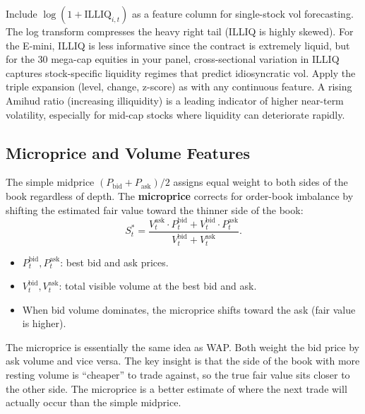 \begin{projectconnection}
Include $\log(1 + \text{ILLIQ}_{i,t})$ as a feature column for single-stock vol forecasting.
The log transform compresses the heavy right tail (ILLIQ is highly skewed).
For the E-mini, ILLIQ is less informative since the contract is extremely liquid, but for the 30 mega-cap equities in your panel, cross-sectional variation in ILLIQ captures stock-specific liquidity regimes that predict idiosyncratic vol.
Apply the triple expansion (level, change, z-score) as with any continuous feature.
A rising Amihud ratio (increasing illiquidity) is a leading indicator of higher near-term volatility, especially for mid-cap stocks where liquidity can deteriorate rapidly.
\end{projectconnection}

\subsection{Microprice and Volume Features}\label{sec:feat-microprice}

The simple midprice $(P_{\text{bid}} + P_{\text{ask}})/2$ assigns equal weight to both sides of the book regardless of depth.
The \textbf{microprice} \citep{CarteaJaimungalPenalva2015} corrects for order-book imbalance by shifting the estimated fair value toward the thinner side of the book:
\begin{equation}\label{eq:microprice}
  S^*_t = \frac{V_t^{\text{ask}} \cdot P_t^{\text{bid}} + V_t^{\text{bid}} \cdot P_t^{\text{ask}}}{V_t^{\text{bid}} + V_t^{\text{ask}}}.
\end{equation}
\begin{itemize}[nosep]
  \item $P_t^{\text{bid}}, P_t^{\text{ask}}$: best bid and ask prices.
  \item $V_t^{\text{bid}}, V_t^{\text{ask}}$: total visible volume at the best bid and ask.
  \item When bid volume dominates, the microprice shifts toward the ask (fair value is higher).
\end{itemize}

\begin{intuition}
The microprice is essentially the same idea as WAP. Both weight the bid price by ask volume and vice versa. The key insight is that the side of the book with more resting volume is ``cheaper'' to trade against, so the true fair value sits closer to the other side. The microprice is a better estimate of where the next trade will actually occur than the simple midprice.
\end{intuition}


